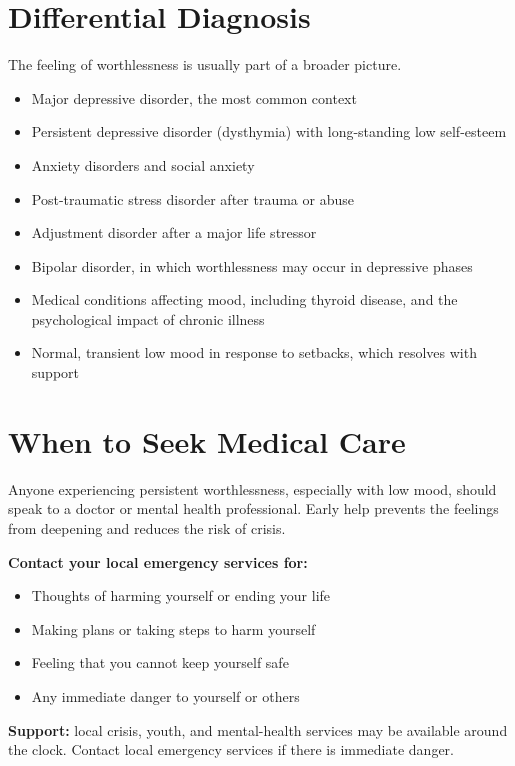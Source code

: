 \section*{Differential Diagnosis}
The feeling of worthlessness is usually part of a broader picture.
\begin{itemize}
    \item Major depressive disorder, the most common context
    \item Persistent depressive disorder (dysthymia) with long-standing low self-esteem
    \item Anxiety disorders and social anxiety
    \item Post-traumatic stress disorder after trauma or abuse
    \item Adjustment disorder after a major life stressor
    \item Bipolar disorder, in which worthlessness may occur in depressive phases
    \item Medical conditions affecting mood, including thyroid disease, and the psychological impact of chronic illness
    \item Normal, transient low mood in response to setbacks, which resolves with support
\end{itemize}

\section*{When to Seek Medical Care}
Anyone experiencing persistent worthlessness, especially with low mood, should speak to a doctor or mental health professional. Early help prevents the feelings from deepening and reduces the risk of crisis.

\textbf{Contact your local emergency services for:}
\begin{itemize}
    \item Thoughts of harming yourself or ending your life
    \item Making plans or taking steps to harm yourself
    \item Feeling that you cannot keep yourself safe
    \item Any immediate danger to yourself or others
\end{itemize}

\textbf{Support:} local crisis, youth, and mental-health services may be available around the clock. Contact local emergency services if there is immediate danger.


